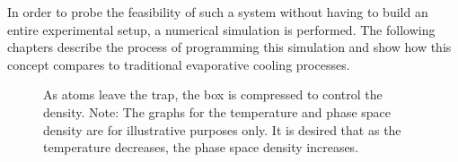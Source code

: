 In order to probe the feasibility of such a system without having to build an entire experimental setup, a numerical simulation is performed. The following chapters describe the process of programming this simulation and show how this concept compares to traditional evaporative cooling processes.
\vfill
\begin{figure}[htbp]
    \centering
    
    \caption[Evaporative cooling in a compressing box potential]{As atoms leave the trap, the box is compressed to control the density. Note: The graphs for the temperature and phase space density are for illustrative purposes only. It is desired that as the temperature decreases, the phase space density increases.}
    \label{fig:evap_box_sketch}
\end{figure}
\vfill